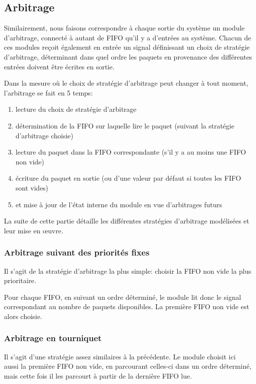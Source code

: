 \subsection{Arbitrage}

Similairement, nous faisons correspondre à chaque sortie du système un module
d'arbitrage, connecté à autant de FIFO qu'il y a d'entrées au système.
Chacun de ces modules reçoit également en entrée un signal définissant un choix
de stratégie d'arbitrage, déterminant dans quel ordre
les paquets en provenance des différentes entrées doivent être écrites en
sortie.

Dans la mesure où le choix de stratégie d'arbitrage peut changer à tout moment,
l'arbitrage se fait en 5 temps:
\begin{enumerate}
  \item lecture du choix de stratégie d'arbitrage
  \item détermination de la FIFO sur laquelle lire le paquet (suivant la stratégie
    d'arbitrage choisie)
  \item lecture du paquet dans la FIFO correspondante (s'il y a au moins une FIFO
    non vide)
  \item écriture du paquet en sortie (ou d'une valeur par défaut si toutes les
    FIFO sont vides)
  \item et mise à jour de l'état interne du module en vue d'arbitrages futurs
\end{enumerate}
La suite de cette partie détaille les différentes stratégies d'arbitrage
 modélisées et leur mise en œuvre.

\subsubsection{Arbitrage suivant des priorités fixes}

Il s'agit de la stratégie d'arbitrage la plus simple: choisir la FIFO non vide
la plus prioritaire.

Pour chaque FIFO, en suivant un ordre déterminé, le module lit donc le signal
correspondant au nombre de paquets disponibles. La première FIFO non vide est
alors choisie.

\subsubsection{Arbitrage en tourniquet}

Il s'agit d'une stratégie assez similaires à la précédente. Le module choisit
ici aussi la première FIFO non vide, en parcourant celles-ci dans un ordre
déterminé, mais cette fois il les parcourt à partir de la dernière FIFO lue.

